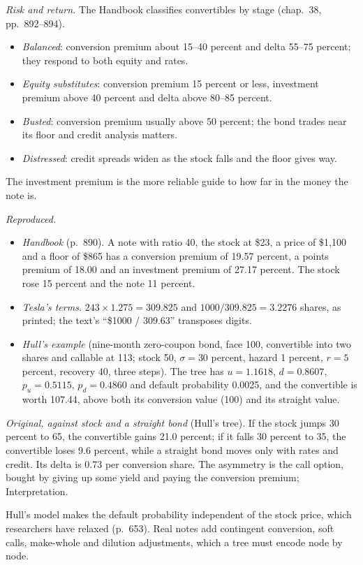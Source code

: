 \begin{qfmethod}
\emph{Risk and return.} The Handbook classifies convertibles by stage (chap.~38, pp.~892--894).
\begin{itemize}
\item \emph{Balanced}: conversion premium about 15--40 percent and delta 55--75 percent; they respond to both equity and rates.
\item \emph{Equity substitutes}: conversion premium 15 percent or less, investment premium above 40 percent and delta above 80--85 percent.
\item \emph{Busted}: conversion premium usually above 50 percent; the bond trades near its floor and credit analysis matters.
\item \emph{Distressed}: credit spreads widen as the stock falls and the floor gives way.
\end{itemize}
The investment premium is the more reliable guide to how far in the money the note is.

 \emph{Reproduced.}
\begin{itemize}
\item \emph{Handbook} (p.~890). A note with ratio 40, the stock at \$23, a price of \$1{,}100 and a floor of \$865 has a conversion premium of 19.57 percent, a points premium of 18.00 and an investment premium of 27.17 percent. The stock rose 15 percent and the note 11 percent.
\item \emph{Tesla's terms.} $243\times1.275=309.825$ and $1000/309.825=3.2276$ shares, as printed; the text's ``\$1000 / 309.63'' transposes digits.
\item \emph{Hull's example} (nine-month zero-coupon bond, face 100, convertible into two shares and callable at 113; stock 50, $\sigma=30$ percent, hazard 1 percent, $r=5$ percent, recovery 40, three steps). The tree has $u=1.1618$, $d=0.8607$, $p_u=0.5115$, $p_d=0.4860$ and default probability 0.0025, and the convertible is worth 107.44, above both its conversion value (100) and its straight value.
\end{itemize}

\emph{Original, against stock and a straight bond} (Hull's tree). If the stock jumps 30 percent to 65, the convertible gains 21.0 percent; if it falls 30 percent to 35, the convertible loses 9.6 percent, while a straight bond moves only with rates and credit. Its delta is 0.73 per conversion share. The asymmetry is the call option, bought by giving up some yield and paying the conversion premium; Interpretation.

 Hull's model makes the default probability independent of the stock price, which researchers have relaxed (p.~653). Real notes add contingent conversion, soft calls, make-whole and dilution adjustments, which a tree must encode node by node.


\end{qfmethod}
